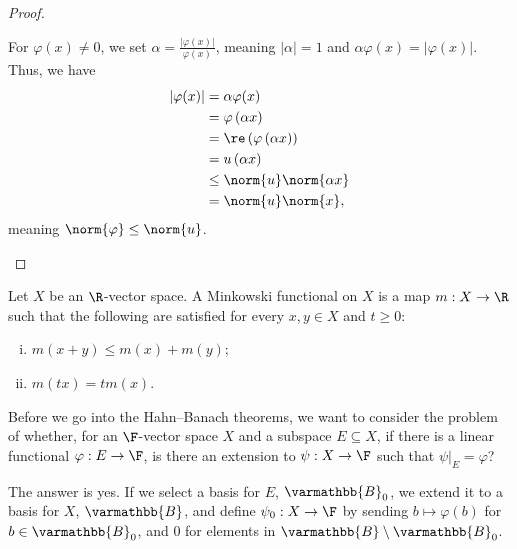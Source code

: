 \documentclass[10pt]{mypackage}
\renewcommand*{\mathbb}[1]{\varmathbb{#1}}
\newcommand{\B}{\mathbb{B}}
\begin{document}
\begin{proof}
\begin{enumerate}[(1)]
        For $\varphi(x) \neq 0$, we set $\alpha = \frac{\left\vert \varphi(x) \right\vert}{\varphi(x)}$, meaning $\left\vert \alpha \right\vert = 1$ and $\alpha\varphi(x) = \left\vert \varphi(x) \right\vert$. Thus, we have
        \begin{align*}
          \left\vert \varphi(x) \right\vert &= \alpha\varphi(x)\\
                                            &= \varphi\left(\alpha x\right)\\
                                            &= \re\left(\varphi\left(\alpha x\right)\right)\\
                                            &= u\left(\alpha x\right)\\
                                            &\leq \norm{u}\norm{\alpha x}\\
                                            &= \norm{u}\norm{x},
        \end{align*}
        meaning $\norm{\varphi}\leq \norm{u}$.
    \end{enumerate}
  \end{proof}
  \begin{definition}
  Let $X$ be an $\R$-vector space. A Minkowski functional on $X$ is a map $m: X\rightarrow \R$ such that the following are satisfied for every $x,y\in X$ and $t\geq 0$:
  \begin{enumerate}[(i)]
    \item $m\left(x+y\right)\leq m(x) + m(y)$;
    \item $m\left(tx\right) = tm(x)$.
  \end{enumerate}
  \end{definition}
  Before we go into the Hahn--Banach theorems, we want to consider the problem of whether, for an $\F$-vector space $X$ and a subspace $E\subseteq X$, if there is a linear functional $\varphi: E\rightarrow \F$, is there an extension to $\psi: X\rightarrow \F$ such that $\psi|_{E} = \varphi$?\newline

  The answer is yes. If we select a basis for $E$, $\B_0$, we extend it to a basis for $X$, $\B$, and define $\psi_0: X\rightarrow \F$ by sending $b\mapsto \varphi(b)$ for $b\in \B_{0}$, and $0$ for elements in $\B\setminus \B_0$.\newline
\end{document}
